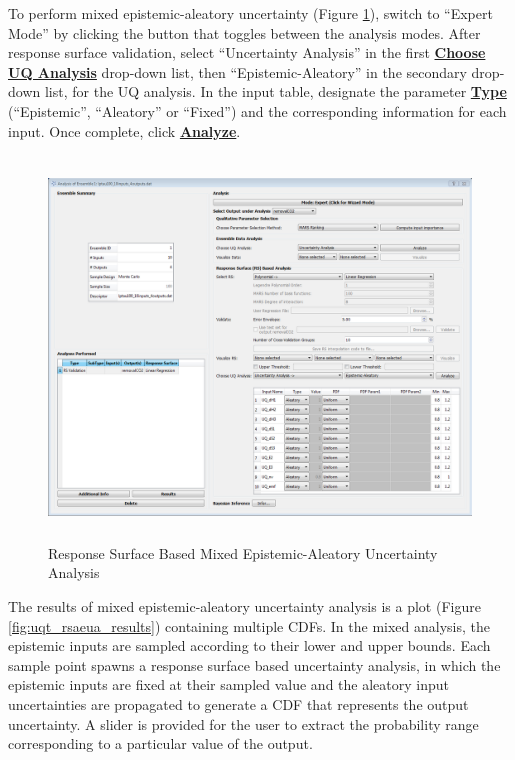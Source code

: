 To perform mixed epistemic-aleatory uncertainty (Figure
\ref{fig:uqt_rsaeua}), switch to ``Expert Mode''
by clicking the  button that toggles between the analysis
modes. After response surface validation, select ``Uncertainty Analysis''
in the first \textbf{\underline{Choose UQ Analysis}} drop-down list, then ``Epistemic-Aleatory'' in the secondary
drop-down list, for the UQ analysis. In the input table, designate the
parameter \textbf{\underline{Type}} (``Epistemic'', ``Aleatory'' or ``Fixed'') and the corresponding
information for each input. Once complete, click \textbf{\underline{Analyze}}.

\begin{figure}[H]
\centering
\includegraphics[width=6.5in,height=4in,keepaspectratio]{Chapt_uq/figs/tutorial/24a_RSAEUA}
\caption{Response Surface Based Mixed Epistemic-Aleatory Uncertainty Analysis}
\label{fig:uqt_rsaeua}
\end{figure}

The results of mixed epistemic-aleatory uncertainty analysis is a plot
(Figure \ref{fig:uqt_rsaeua_results})
containing multiple CDFs. In the mixed analysis, the epistemic inputs are
sampled according to their lower and upper bounds. Each sample point spawns
a response surface based uncertainty analysis, in which 
the epistemic inputs are fixed at their sampled value and the aleatory
input uncertainties are propagated to generate a CDF that represents the
output uncertainty. A slider is provided for the user to extract the
probability range corresponding to a particular value of the output.

